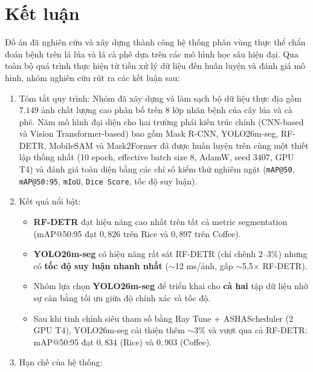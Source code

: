 
\section{Kết luận}
\label{sec:conclusion}

Đồ án đã nghiên cứu và xây dựng thành công hệ thống phân vùng thực thể chẩn đoán bệnh trên lá lúa và lá cà phê dựa trên các mô hình học sâu hiện đại. Qua toàn bộ quá trình thực hiện từ tiền xử lý dữ liệu đến huấn luyện và đánh giá mô hình, nhóm nghiên cứu rút ra các kết luận sau:

\begin{enumerate}
    \item Tóm tắt quy trình: Nhóm đã xây dựng và làm sạch bộ dữ liệu thực địa gồm $7.149$ ảnh chất lượng cao phân bố trên 8 lớp nhãn bệnh của cây lúa và cà phê. Năm mô hình đại diện cho hai trường phái kiến trúc chính (CNN-based và Vision Transformer-based) bao gồm Mask R-CNN, YOLO26m-seg, RF-DETR, MobileSAM và Mask2Former đã được huấn luyện trên cùng một thiết lập thống nhất (10 epoch, effective batch size 8, AdamW, seed 3407, GPU T4) và đánh giá toàn diện bằng các chỉ số kiểm thử nghiêm ngặt (\texttt{mAP@50}, \texttt{mAP@50:95}, \texttt{mIoU}, \texttt{Dice Score}, tốc độ suy luận).
    \item Kết quả nổi bật:
          \begin{itemize}
              \item \textbf{RF-DETR} đạt hiệu năng cao nhất trên tất cả metric segmentation (mAP@50:95 đạt $0,826$ trên Rice và $0,897$ trên Coffee).
              \item \textbf{YOLO26m-seg} có hiệu năng rất sát RF-DETR (chỉ chênh 2--3\%) nhưng có \textbf{tốc độ suy luận nhanh nhất} ($\sim$12 ms/ảnh, gấp $\sim$5,5× RF-DETR).
              \item Nhóm lựa chọn \textbf{YOLO26m-seg} để triển khai cho \textbf{cả hai} tập dữ liệu nhờ sự cân bằng tối ưu giữa độ chính xác và tốc độ.
              \item Sau khi tinh chỉnh siêu tham số bằng Ray Tune + ASHAScheduler (2 GPU T4), YOLO26m-seg cải thiện thêm $\sim$3\% và vượt qua cả RF-DETR: mAP@50:95 đạt $0,834$ (Rice) và $0,903$ (Coffee).
          \end{itemize}
    \item Hạn chế của hệ thống:
          \begin{itemize}

\end{itemize}
\end{enumerate}
